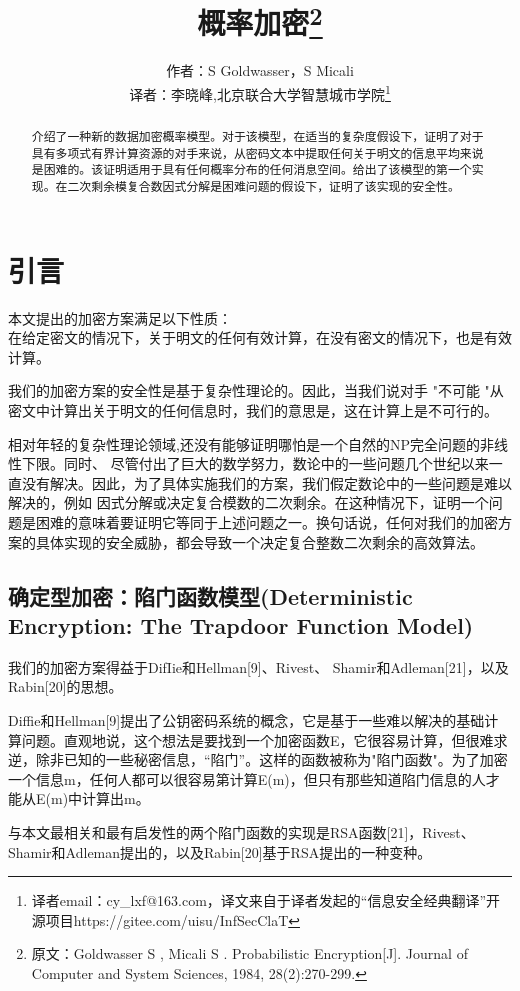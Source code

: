 \documentclass[]{article}
\title{概率加密\footnote{原文：Goldwasser S ,  Micali S . Probabilistic Encryption[J]. Journal of Computer and System Sciences, 1984, 28(2):270-299.}}
\author{作者：S Goldwasser，S Micali\\
\small{译者：李晓峰,北京联合大学智慧城市学院\footnote{译者email：cy\_lxf@163.com，译文来自于译者发起的“信息安全经典翻译”开源项目https://gitee.com/uisu/InfSecClaT}}
}
\begin{document}
\maketitle

\begin{abstract}
介绍了一种新的数据加密概率模型。对于该模型，在适当的复杂度假设下，证明了对于具有多项式有界计算资源的对手来说，从密码文本中提取任何关于明文的信息平均来说是困难的。该证明适用于具有任何概率分布的任何消息空间。给出了该模型的第一个实现。在二次剩余模复合数因式分解是困难问题的假设下，证明了该实现的安全性。
\end{abstract}

\section{引言}
本文提出的加密方案满足以下性质：\\
在给定密文的情况下，关于明文的任何有效计算，在没有密文的情况下，也是有效计算。\par

我们的加密方案的安全性是基于复杂性理论的。因此，当我们说对手 "不可能 "从密文中计算出关于明文的任何信息时，我们的意思是，这在计算上是不可行的。\par

相对年轻的复杂性理论领域,还没有能够证明哪怕是一个自然的NP完全问题的非线性下限。同时、 尽管付出了巨大的数学努力，数论中的一些问题几个世纪以来一直没有解决。因此，为了具体实施我们的方案，我们假定数论中的一些问题是难以解决的，例如 因式分解或决定复合模数的二次剩余。在这种情况下，证明一个问题是困难的意味着要证明它等同于上述问题之一。换句话说，任何对我们的加密方案的具体实现的安全威胁，都会导致一个决定复合整数二次剩余的高效算法。

\subsection{确定型加密：陷门函数模型(Deterministic Encryption: The Trapdoor Function Model)}

我们的加密方案得益于DifIie和Hellman[9]、Rivest、 Shamir和Adleman[21]，以及Rabin[20]的思想。


Diffie和Hellman[9]提出了公钥密码系统的概念，它是基于一些难以解决的基础计算问题。直观地说，这个想法是要找到一个加密函数E，它很容易计算，但很难求逆，除非已知的一些秘密信息，“陷门”。这样的函数被称为"陷门函数"。为了加密一个信息m，任何人都可以很容易第计算E(m)，但只有那些知道陷门信息的人才能从E(m)中计算出m。


与本文最相关和最有启发性的两个陷门函数的实现是RSA函数[21]，Rivest、Shamir和Adleman提出的，以及Rabin[20]基于RSA提出的一种变种。
\end{document}

